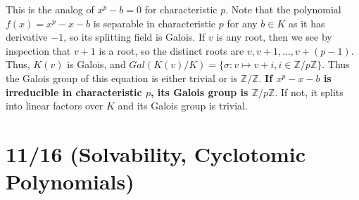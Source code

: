 \documentclass[11pt, oneside]{amsart}   	%
\theoremstyle{definition}
\begin{document}
\begin{itemize}
	This is the analog of $x^p - b = 0$ for characteristic $p$. Note that the polynomial $f(x) = x^p - x - b$ is separable in characteristic $p$ for any $b\in K$ 
	as it has derivative $-1$, so its splitting field is Galois. If $v$ is any root, then we see by inspection that $v + 1$ is a root, so the distinct roots are 
	$v, v + 1, ..., v + (p - 1)$. Thus, $K(v)$ is Galois, and $Gal(K(v) / K) = \{\sigma : v\mapsto v + i, i\in \mathbb Z / p\mathbb Z\}$. Thus the Galois group 
	of this equation is either trivial or is $\mathbb Z / \mathbb Z$. \textbf{If $x^p - x - b$ is irreducible in characteristic $p$, its Galois group is $\mathbb Z / 
	p\mathbb Z$}. If not, it splits into linear factors over $K$ and its Galois group is trivial.

\end{itemize}

\section{11/16 (Solvability, Cyclotomic Polynomials)}
\end{document}
